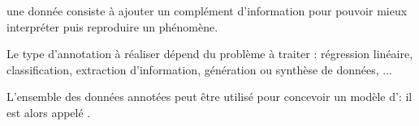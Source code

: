 		
	
	
	\begin{leftBarSummary}
		\begin{todolist}
			\item[\itemok]  une donnée consiste à ajouter un complément d'information pour pouvoir mieux interpréter puis reproduire un phénomène.
			\item[\itemok] Le type d'annotation à réaliser dépend du problème à traiter : régression linéaire, classification, extraction d'information, génération ou synthèse de données, ...
			\item[\itemok] L'ensemble des données annotées peut être utilisé pour concevoir un modèle d': il est alors appelé .
		\end{todolist}
	\end{leftBarSummary}